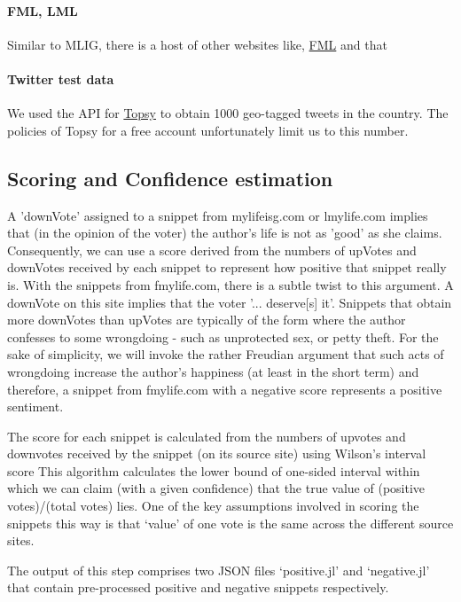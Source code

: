 \documentclass[11pt, letterpaper, conference, final, twocolumn]{ieeeconf}
\begin{document}
\paragraph{FML, LML}
Similar to MLIG, there is a host of other websites like, \href{fmylife.com}{FML} and  that 
\paragraph{Twitter test data}
We used the API for \href{topsy.com}{Topsy} to obtain 1000 geo-tagged tweets in the country. The policies of Topsy for a free account unfortunately limit us to this number.

\subsection{Scoring and Confidence estimation}
\label{ssec:scoring}

A 'downVote' assigned to a snippet from mylifeisg.com or lmylife.com implies
that (in the opinion of the voter) the author's life is not as 'good' as she
claims. Consequently, we can use a score derived from the numbers of upVotes
and downVotes received by each snippet to represent how positive that snippet
really is. With the snippets from fmylife.com, there is a subtle twist to this
argument. A downVote on this site implies that the voter '... deserve[s] it'.
Snippets that obtain more downVotes than upVotes are typically of the form
where the author confesses to some wrongdoing - such as unprotected sex, or
petty theft. For the sake of simplicity, we will invoke the rather Freudian
argument that such acts of wrongdoing increase the author's happiness (at least
in the short term) and therefore, a snippet from fmylife.com with a negative
score represents a positive sentiment.

The score for each snippet is calculated from the numbers of upvotes and
downvotes received by the snippet (on its source site) using Wilson's interval score
This algorithm calculates the lower bound of one-sided interval within which we
can claim (with a given confidence) that the true value of (positive
votes)/(total votes) lies. One of the key assumptions involved in scoring the snippets this way is that `value' of one vote is the same across the different source sites. 

The output of this step comprises two JSON files `positive.jl' and `negative.jl' that contain pre-processed positive and negative snippets respectively.
\end{document}
